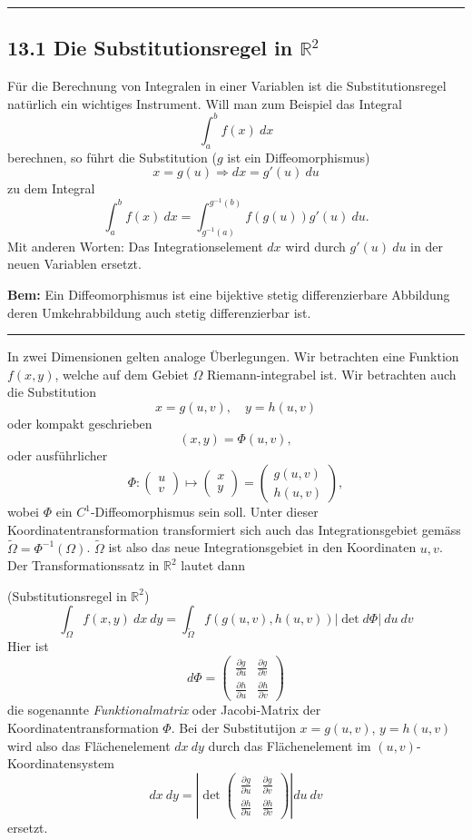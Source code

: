 \documentclass[a4paper,landscape,8pt]{extarticle}
\newcommand{\R}{\mathbb{R}}
\newcommand{\abs}[1]{\left\lvert #1 \right\rvert}
\newcommand{\sep}{\vspace{5pt}\noindent\hrule\vspace{5pt}}
\newcommand{\Bem}{\textbf{Bem: }}
\begin{document}
\begin{multicols*}{4}
\sep

\subsection{13.1 Die Substitutionsregel in $\R^2$}

Für die Berechnung von Integralen in einer Variablen ist die Substitutionsregel
natürlich ein wichtiges Instrument. Will man zum Beispiel das Integral
\[
\int_a^bf(x)\ dx
\]
berechnen, so führt die Substitution ($g$ ist ein Diffeomorphismus)
\[
x=g(u) \Longrightarrow dx=g'(u) \ du
\]
zu dem Integral
\[
\int_a^bf(x) \ dx = \int_{g^{-1}(a)}^{g^{-1}(b)} f(g(u))g'(u) \ du.
\]
Mit anderen Worten: Das Integrationselement $dx$ wird durch $g'(u) \ du$ in der
neuen Variablen ersetzt.

\Bem Ein Diffeomorphismus ist eine bijektive stetig
differenzierbare Abbildung deren Umkehrabbildung auch stetig differenzierbar ist.

\sep

In zwei Dimensionen gelten analoge Überlegungen. Wir betrachten eine Funktion
$f(x,y)$, welche auf dem Gebiet $\Omega$ Riemann-integrabel ist. Wir betrachten
auch die Substitution
\[
x=g(u,v),\quad y=h(u,v)
\]
oder kompakt geschrieben
\[
(x,y) = \Phi(u,v),
\]
oder ausführlicher
\[
\Phi
\colon
\begin{pmatrix}
u\\
v
\end{pmatrix}
\mapsto
\begin{pmatrix}
x\\
y
\end{pmatrix}
=
\begin{pmatrix}
g(u,v)\\
h(u,v)
\end{pmatrix},
\]
wobei $\Phi$ ein $C^1$-Diffeomorphismus sein soll. Unter dieser
Koordinatentransformation transformiert sich auch das Integrationsgebiet gemäss
$\widetilde{\Omega}=\Phi^{-1}(\Omega)$. $\widetilde{\Omega}$ ist also das neue
Integrationsgebiet in den Koordinaten $u,v$. Der Transformationssatz in $\R^2$
lautet dann

\Satz (Substitutionsregel in $\R^2$)
\[
\int_\Omega f(x,y) \ dx \ dy = \int_{\widetilde{\Omega}} f(g(u,v), h(u,v))
\abs{\det d\Phi} \ du \ dv
\]
Hier ist
\[
d\Phi = \begin{pmatrix}
\frac{\partial g}{\partial u} & \frac{\partial g}{\partial v}\\
\frac{\partial h}{\partial u} & \frac{\partial h}{\partial v}
\end{pmatrix}
\]
die sogenannte \emph{Funktionalmatrix} oder Jacobi-Matrix der
Koordinatentransformation $\Phi$. Bei der Substitutijon $x=g(u,v)$, $y=h(u,v)$
wird also das Flächenelement $dx \ dy$ durch das Flächenelement im
$(u,v)$-Koordinatensystem
\[
dx \ dy = 
\abs{\det\begin{pmatrix}
\frac{\partial g}{\partial u} & \frac{\partial g}{\partial v}\\
\frac{\partial h}{\partial u} & \frac{\partial h}{\partial v}
\end{pmatrix}}
du \ dv
\]
ersetzt.


\end{multicols*}
\end{document}
